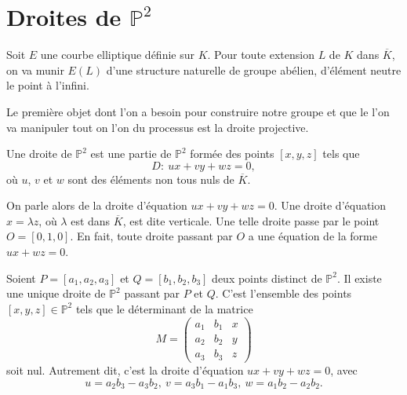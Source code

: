 \section{Droites de $\mathbb{P}^2$}
Soit $E$ une courbe elliptique définie sur $K$. Pour toute extension $L$ de $K$ dans $\overline{K}$, on va munir $E(L)$ d'une structure naturelle de groupe abélien, d'élément neutre le point à l'infini.

Le première objet dont l'on a besoin pour construire notre groupe et que le l'on va
manipuler tout on l'on du processus est la droite projective.

\begin{definition}
    Une droite de $\mathbb{P}^2$ est une partie de $\mathbb{P}^2$ formée des points $[x,y,z]$ tels que 
    \[
    D :\ ux+vy+wz=0
    ,\] 
    où $u$, $v$ et $w$ sont des éléments non tous nuls de $\overline{K}$.
\end{definition}

On parle alors de la droite d'équation $ux+vy+wz=0$. Une droite d'équation $x=\lambda z$, où $\lambda$ est dans $\overline{K}$, est dite verticale. Une telle droite passe par le point $O = [0,1,0]$. En fait, toute droite passant par $O$ a une équation de la forme $ux+wz=0$.


\begin{lemme}
    \label{lem:lemme2}
    



    Soient $P = \left[ a_1, a_2, a_3 \right]$ et $Q = \left[ b_1, b_2, b_3 \right]$ deux points distinct de $\mathbb{P}^2$. Il existe une unique droite de $\mathbb{P}^2$ passant par $P$ et $Q$. C'est l'ensemble des points $\left[ x, y, z \right] \in \mathbb{P}^2$ tels que le déterminant de la matrice
    \[
        M = 
    \begin{pmatrix}
        a_1 & b_1 & x \\ 
        a_2 & b_2 & y \\
        a_3 & b_3 & z
    \end{pmatrix}
    \] 
    soit nul. Autrement dit, c'est la droite d'équation $ux + vy + wz = 0$, avec
    \[
    u = a_2b_3 - a_3b_2, \ v = a_3b_1 - a_1b_3, \ w = a_1b_2 - a_2b_2
    .\] 
\end{lemme}

